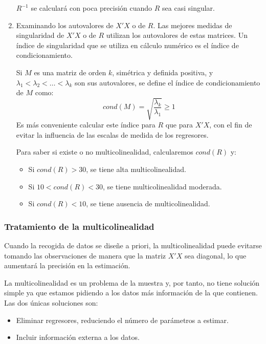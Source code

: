 \begin{enumerate}
          $R^{-1}$ se calculará con poca precisión cuando $R$ sea casi singular.
    \item Examinando los autovalores de $X'X$ o de $R$.
          Las mejores medidas de singularidad de $X'X$ o de $R$ utilizan los autovalores de estas matrices.
          Un índice de singularidad que se utiliza en cálculo numérico es el índice de condicionamiento.

          Si $M$ es una matriz de orden $k$, simétrica y definida positiva, y $\lambda_1 < \lambda_2 < \dots < \lambda_k$ son sus autovalores, se define el índice de condicionamiento de $M$ como:
          $$cond(M) = \sqrt{\frac{\lambda_k}{\lambda_1}} \geq 1$$
          Es más conveniente calcular este índice para $R$ que para $X'X$, con el fin de evitar la influencia de las escalas de medida de los regresores.

          Para saber si existe o no multicolinealidad, calcularemos $cond(R)$ y:
          \begin{itemize}
              \item Si $cond(R) > 30$, se tiene alta multicolinealidad.
              \item Si $10 < cond(R) < 30$, se tiene multicolinealidad moderada.
              \item Si $cond(R) < 10$, se tiene ausencia de multicolinealidad.
          \end{itemize}
\end{enumerate}

\subsubsection*{Tratamiento de la multicolinealidad}
Cuando la recogida de datos se diseñe a priori, la multicolinealidad puede evitarse tomando las observaciones de manera que la matriz $X'X$ sea diagonal, lo que aumentará la precisión en la estimación.

La multicolinealidad es un problema de la muestra y, por tanto, no tiene solución simple ya que estamos pidiendo a los datos más información de la que contienen.
Las dos únicas soluciones son:
\begin{itemize}
    \item Eliminar regresores, reduciendo el número de parámetros a estimar.
    \item Incluir información externa a los datos.
\end{itemize}

